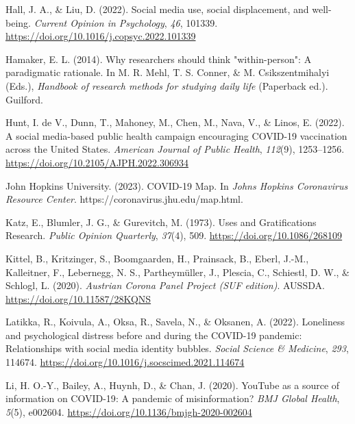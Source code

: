 \documentclass[
  man,mask,floatsintext]{apa7}
\newlength{\cslhangindent}
\newenvironment{CSLReferences}[2] %
 {\begin{list}{}{%
  \setlength{\itemindent}{0pt}
  \setlength{\leftmargin}{0pt}
  \setlength{\parsep}{0pt}
  \ifodd #1
   \setlength{\leftmargin}{\cslhangindent}
   \setlength{\itemindent}{-1\cslhangindent}
  \fi
  \setlength{\itemsep}{#2\baselineskip}}}
 {\end{list}}
\begin{document}
\begin{CSLReferences}{1}{0}
Hall, J. A., \& Liu, D. (2022). Social media use, social displacement, and well-being. \emph{Current Opinion in Psychology}, \emph{46}, 101339. \url{https://doi.org/10.1016/j.copsyc.2022.101339}

Hamaker, E. L. (2014). Why researchers should think "within-person": {A} paradigmatic rationale. In M. R. Mehl, T. S. Conner, \& M. Csikszentmihalyi (Eds.), \emph{Handbook of research methods for studying daily life} (Paperback ed.). Guilford.

Hunt, I. de V., Dunn, T., Mahoney, M., Chen, M., Nava, V., \& Linos, E. (2022). A social media-based public health campaign encouraging {COVID-19} vaccination across the {United States}. \emph{American Journal of Public Health}, \emph{112}(9), 1253--1256. \url{https://doi.org/10.2105/AJPH.2022.306934}

John Hopkins University. (2023). {COVID-19 Map}. In \emph{Johns Hopkins Coronavirus Resource Center}. https://coronavirus.jhu.edu/map.html.

Katz, E., Blumler, J. G., \& Gurevitch, M. (1973). Uses and {Gratifications Research}. \emph{Public Opinion Quarterly}, \emph{37}(4), 509. \url{https://doi.org/10.1086/268109}

Kittel, B., Kritzinger, S., Boomgaarden, H., Prainsack, B., Eberl, J.-M., Kalleitner, F., Lebernegg, N. S., Partheymüller, J., Plescia, C., Schiestl, D. W., \& Schlogl, L. (2020). \emph{Austrian {Corona Panel Project} ({SUF} edition)}. AUSSDA. \url{https://doi.org/10.11587/28KQNS}

Latikka, R., Koivula, A., Oksa, R., Savela, N., \& Oksanen, A. (2022). Loneliness and psychological distress before and during the {COVID-19} pandemic: {Relationships} with social media identity bubbles. \emph{Social Science \& Medicine}, \emph{293}, 114674. \url{https://doi.org/10.1016/j.socscimed.2021.114674}

Li, H. O.-Y., Bailey, A., Huynh, D., \& Chan, J. (2020). {YouTube} as a source of information on {COVID-19}: A pandemic of misinformation? \emph{BMJ Global Health}, \emph{5}(5), e002604. \url{https://doi.org/10.1136/bmjgh-2020-002604}


\end{CSLReferences}
\end{document}
